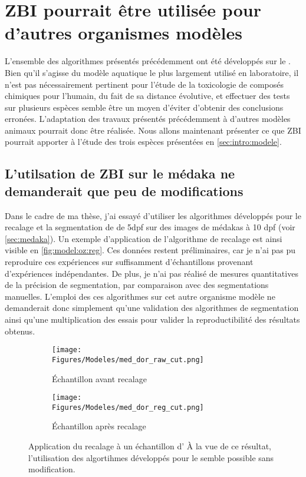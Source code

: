 \documentclass[\main/main.tex]{subfiles}
\begin{document}
                    
\section{\label{sec:modeles}ZBI pourrait être utilisée pour d'autres organismes modèles}

%
L'ensemble des algorithmes présentés précédemment ont été développés sur le \pz.
%
Bien qu'il s'agisse du modèle aquatique le plus largement utilisé en laboratoire, il n'est pas nécessairement pertinent pour l'étude de la toxicologie de composés chimiques pour l'humain, du fait de sa distance évolutive, et effectuer des tests sur plusieurs espèces semble être un moyen d'éviter d'obtenir des conclusions erronées.
%
L'adaptation des travaux présentés précédemment à d'autres modèles animaux pourrait donc être réalisée.
%
Nous allons maintenant présenter ce que ZBI pourrait apporter à l'étude des trois espèces présentées en \autoref{sec:intro:modele}.

    \subsection{L'utilsation de ZBI sur le médaka ne demanderait que peu de modifications}

%
Dans le cadre de ma thèse, j'ai essayé d'utiliser les algorithmes développés pour le recalage
et la segmentation de \pz{} de 5dpf sur des images de médakas à 10 dpf (voir \autoref{sec:medaka}).
%
Un exemple d'application de l'algorithme de recalage est ainsi visible en \autoref{fig:model:oz:reg}.
%
Ces données restent préliminaires, car je n'ai pas pu reproduire ces expériences sur suffisamment d'échantillons provenant d'expériences indépendantes. De plus, je n'ai pas réalisé de mesures quantitatives de la précision de segmentation, par comparaison avec des segmentations manuelles.
%
L'emploi des ces algorithmes sur cet autre organisme modèle ne demanderait donc simplement qu'une validation des algorithmes de segmentation ainsi qu'une multiplication des essais pour valider la reproductibilité des résultats obtenus.

\begin{figure}[htbp]
    \centering
    \begin{subfigure}[b]{0.475\textwidth}
       \caption{
            Échantillon avant recalage
            }
       \centering \texttt{[image: \\Figures/Modeles/med\_dor\_raw\_cut.png]}
    \end{subfigure}
    \begin{subfigure}[b]{0.475\textwidth}
       \caption{
            Échantillon après recalage
            }
       \centering \texttt{[image: \\Figures/Modeles/med\_dor\_reg\_cut.png]}
    \end{subfigure}
    \caption{
        \label{fig:model:oz:reg}
        Application du recalage à un échantillon d'\ol{}\newline
        À la vue de ce résultat, l'utilisation des algortihmes développés pour le \pz{} semble possible sans modification.
        }
\end{figure}
\end{document}
